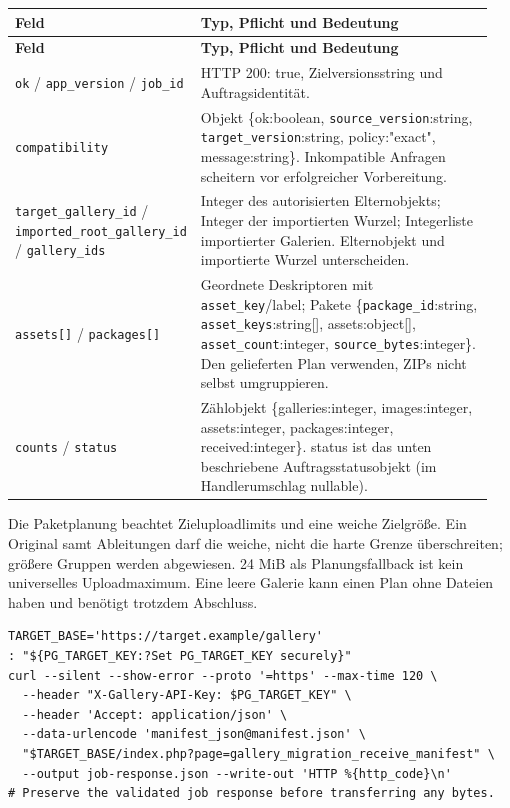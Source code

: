 \documentclass[11pt,a4paper]{article}
\newcommand{\codeword}[1]{\nolinkurl{#1}}
\begin{document}
\begin{longtable}{@{}>{\RaggedRight\arraybackslash}p{0.28\linewidth}>{\RaggedRight\arraybackslash}p{0.67\linewidth}@{}}
\toprule
\textbf{Feld} & \textbf{Typ, Pflicht und Bedeutung} \\
\midrule
\endfirsthead
\toprule
\textbf{Feld} & \textbf{Typ, Pflicht und Bedeutung} \\
\midrule
\endhead
\bottomrule
\endfoot
\codeword{ok} / \codeword{app_version} / \codeword{job_id} & HTTP 200: true,
Zielversionsstring und Auftragsidentität. \\
\codeword{compatibility} & Objekt \{ok:boolean, \codeword{source_version}:string,
\codeword{target_version}:string, policy:"exact", message:string\}. Inkompatible Anfragen
scheitern vor erfolgreicher Vorbereitung. \\
\codeword{target_gallery_id} / \codeword{imported_root_gallery_id} / \codeword{gallery_ids}
& Integer des autorisierten Elternobjekts; Integer der importierten Wurzel; Integerliste
importierter Galerien. Elternobjekt und importierte Wurzel unterscheiden. \\
\codeword{assets[]} / \codeword{packages[]} & Geordnete Deskriptoren mit
\codeword{asset_key}/label; Pakete \{\codeword{package_id}:string,
\codeword{asset_keys}:string[], assets:object[], \codeword{asset_count}:integer,
\codeword{source_bytes}:integer\}. Den gelieferten Plan verwenden, ZIPs nicht selbst
umgruppieren. \\
\codeword{counts} / \codeword{status} & Zählobjekt \{galleries:integer, images:integer,
assets:integer, packages:integer, received:integer\}. status ist das unten beschriebene
Auftragsstatusobjekt (im Handlerumschlag nullable). \\
\end{longtable}

Die Paketplanung beachtet Zieluploadlimits und eine weiche Zielgröße. Ein Original samt
Ableitungen darf die weiche, nicht die harte Grenze überschreiten; größere Gruppen werden
abgewiesen. 24 MiB als Planungsfallback ist kein universelles Uploadmaximum. Eine leere
Galerie kann einen Plan ohne Dateien haben und benötigt trotzdem Abschluss.

\begin{lstlisting}[language={}]
TARGET_BASE='https://target.example/gallery'
: "${PG_TARGET_KEY:?Set PG_TARGET_KEY securely}"
curl --silent --show-error --proto '=https' --max-time 120 \
  --header "X-Gallery-API-Key: $PG_TARGET_KEY" \
  --header 'Accept: application/json' \
  --data-urlencode 'manifest_json@manifest.json' \
  "$TARGET_BASE/index.php?page=gallery_migration_receive_manifest" \
  --output job-response.json --write-out 'HTTP %{http_code}\n'
# Preserve the validated job response before transferring any bytes.
\end{lstlisting}
\end{document}

